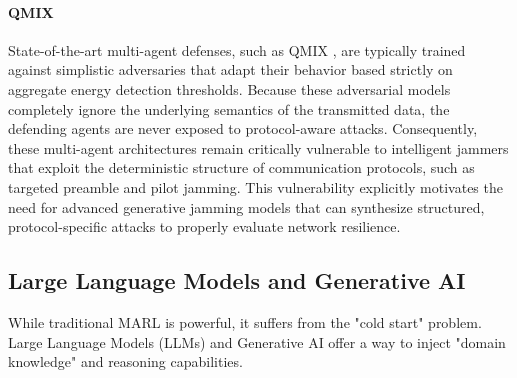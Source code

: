 \documentclass[journal]{IEEEtran}
\newcommand{\adm}[1]{{\color{orange}{[#1]}}}
\newcommand{\rar}[1]{{\color{blue}{[#1]}}}
\begin{document}
\paragraph{QMIX}
State-of-the-art multi-agent defenses, such as QMIX \cite{abolhassani2025coordinated}, are typically trained against simplistic adversaries that adapt their behavior based strictly on aggregate energy detection thresholds.
Because these adversarial models completely ignore the underlying semantics of the transmitted data, the defending agents are never exposed to protocol-aware attacks.
Consequently, these multi-agent architectures remain critically vulnerable to intelligent jammers that exploit the deterministic structure of communication protocols, such as targeted preamble and pilot jamming.
This vulnerability explicitly motivates the need for advanced generative jamming models that can synthesize structured, protocol-specific attacks to properly evaluate network resilience.




\subsection{Large Language Models and Generative AI}

While traditional MARL is powerful, it suffers from the "cold start" problem.
Large Language Models (LLMs) and Generative AI offer a way to inject "domain knowledge" and reasoning capabilities.
\adm{hypothesis to be verified. when does the higher compute of an LLM outperform smaller, more efficient narrow-task models?}
\rar{research?}
\end{document}
